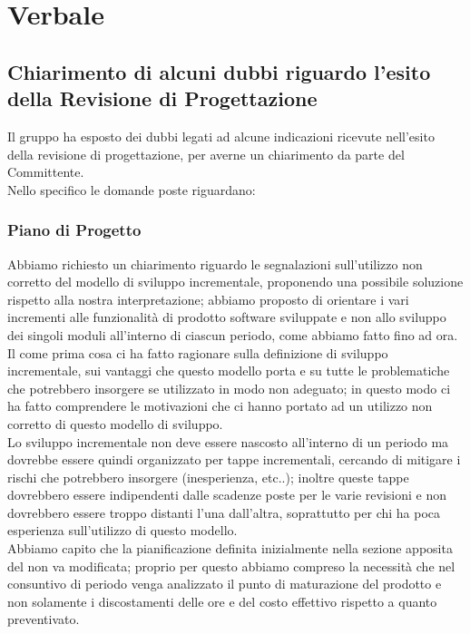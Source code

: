 \section{Verbale}
\subsection{Chiarimento di alcuni dubbi riguardo l'esito della Revisione di Progettazione}
Il gruppo ha esposto dei dubbi legati ad alcune indicazioni ricevute nell'esito della revisione di progettazione, per averne un chiarimento da parte del Committente. \\
Nello specifico le domande poste riguardano:

	\subsubsection*{Piano di Progetto}
	Abbiamo richiesto un chiarimento riguardo le segnalazioni sull'utilizzo non corretto del modello di sviluppo incrementale, proponendo una possibile soluzione rispetto alla nostra interpretazione; abbiamo proposto di orientare i vari incrementi alle funzionalità di prodotto software sviluppate e non allo sviluppo dei singoli moduli all'interno di ciascun periodo, come abbiamo fatto fino ad ora. \\
	Il \TV{} come prima cosa ci ha fatto ragionare sulla definizione di sviluppo incrementale, sui vantaggi che questo modello porta e su tutte le problematiche che potrebbero insorgere se utilizzato in modo non adeguato; in questo modo ci ha fatto comprendere le motivazioni che ci hanno portato ad un utilizzo non corretto di questo modello di sviluppo. \\
	Lo sviluppo incrementale non deve essere nascosto all'interno di un periodo ma dovrebbe essere quindi organizzato per tappe incrementali, cercando di mitigare i rischi che potrebbero insorgere (inesperienza, etc..); inoltre queste tappe dovrebbero essere indipendenti dalle scadenze poste per le varie revisioni e non dovrebbero essere troppo distanti l'una dall'altra, soprattutto per chi ha poca esperienza sull'utilizzo di questo modello. \\
	Abbiamo capito che la pianificazione definita inizialmente nella sezione apposita del \PdP{} non va modificata; proprio per questo abbiamo compreso la necessità che nel consuntivo di periodo venga analizzato il punto di maturazione del prodotto e non solamente i discostamenti delle ore e del costo effettivo rispetto a quanto preventivato. \\
